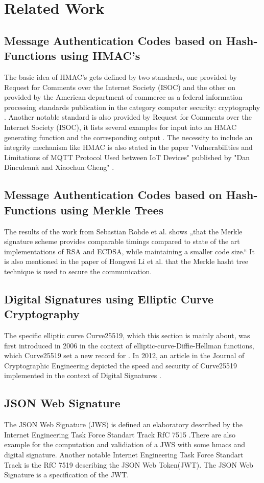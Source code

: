 \section{Related Work}

\subsection{Message Authentication Codes based on Hash-Functions using HMAC's}

The basic idea of HMAC’s gets defined by two standards, one provided by Request for Comments over the Internet Society (ISOC) \cite{RFC} and the other on provided by the American department of commerce as a federal information processing standards publication in the category computer security: cryptography \cite{FIBS}. Another notable standard is also provided by Request for Comments over the Internet Society (ISOC), it lists several examples for input into an HMAC generating function and the corresponding output \cite{RFC2}. The necessity to include an integrity mechanism like HMAC is also stated in the paper "Vulnerabilities and Limitations of MQTT Protocol
Used between IoT Devices" published by "Dan Dinculeană and Xiaochun Cheng" \cite{LIMI}.

\subsection{Message Authentication Codes based on Hash-Functions using Merkle Trees}
The results of the work from Sebastian Rohde et al. shows „that the Merkle signature scheme provides comparable timings compared to state of the art implementations of RSA and ECDSA, while maintaining a smaller code size.“ \cite{FHB} It is also mentioned in the paper of Hongwei Li et al. that the Merkle hasht tree technique is used to secure the communication. \cite{METR}

\subsection{Digital Signatures using Elliptic Curve Cryptography}
The specific elliptic curve Curve25519, which this section is mainly about, was first introduced in 2006 in the context of elliptic-curve-Diffie-Hellman functions, which Curve25519 set a new record for \cite{ECDH}. In 2012, an article in the Journal of Cryptographic Engineering depicted the speed and security of Curve25519 implemented in the context of Digital Signatures \cite{Curve25519}.

\subsection{JSON Web Signature}
The JSON Web Signature (JWS) is defined an elaboratory described by the Internet Engineering Task Force Standart Track RfC 7515 \cite{rfc7515}.There are also example for the computation and validiation of a JWS with some hmacs and digital signature. Another notable Internet Engineering Task Force Standart Track is the RfC 7519 \cite{rfc7519}describing the JSON Web Token(JWT). The JSON Web Signature is a specification of the JWT.
